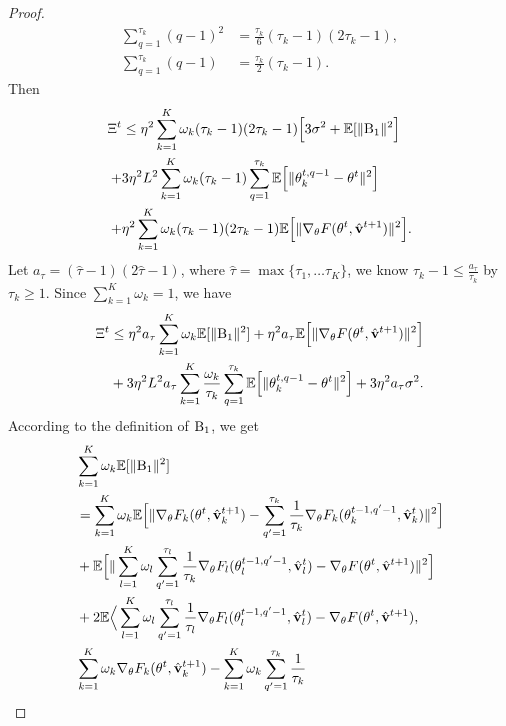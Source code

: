 \documentclass[twoside,journal]{IEEEtran}
\def\VectorFont{\bf}
\newcommand{\vv}{{\VectorFont v}}
\begin{document}
\begin{proof}
\begin{align*}
\sum_{q=1}^{\tau_k}(q-1)^2&=\frac{\tau_k}{6}(\tau_k-1)(2\tau_k-1), \\ \sum_{q=1}^{\tau_k}(q-1)&=\frac{\tau_k}{2}(\tau_k-1).
\end{align*}
Then
\begin{align}\label{eqn: theta1111}
\nonumber\Xi^t &\leq
\eta^2\sum_{k=1}^K\omega_k(\tau_k-1)(2\tau_k-1)\Big[3\sigma^2
+\mathbb{E}[\|\textmd{B}_1\|^2\Big]\\
\nonumber+&
3\eta^2L^2\sum_{k=1}^K\omega_k(\tau_k-1)\sum_{q=1}^{\tau_k}
\mathbb{E}\Big[\|
\theta_k^{t,q-1}-
\theta^{t}\|^2\Big]\\
 +&\eta^2\sum_{k=1}^K\omega_k(\tau_k-1)(2\tau_k-1)\mathbb{E}\Big[\|
\nabla_{\theta}F(\theta^{t},\hat{\vv}^{t+1})
\|^2\Big].
\end{align}
Let  $a_{\tau}=(\hat{\tau}-1)(2\hat{\tau}-1)$, where $\hat{\tau}=\max\{\tau_1,\ldots\tau_K\}$, we know $\tau_k-1\leq \frac{a_{\tau}}{\tau_k}$ by $\tau_k\geq 1$. Since $\sum_{k=1}^K\omega_k=1$,  we have
\begin{align}\label{eqn: theta1112}
\nonumber\Xi^t &\leq
\eta^2a_{\tau}\sum_{k=1}^K\omega_k
\mathbb{E}[\|\textmd{B}_1\|^2]+\eta^2a_{\tau}\mathbb{E}\Big[\|
\nabla_{\theta}F(\theta^{t},\hat{\vv}^{t+1})
\|^2\Big]
\\
&+
3\eta^2L^2a_{\tau}\sum_{k=1}^K\frac{\omega_k}{\tau_k}\sum_{q=1}^{\tau_k}
\mathbb{E}\Big[\|
\theta_k^{t,q-1}-
\theta^{t}\|^2\Big]+3\eta^2a_{\tau}\sigma^2.
\end{align}
According to the definition of $\textmd{B}_1$, we get
\begin{align} \label{eqn: A1}
\nonumber&\sum_{k=1}^K\omega_k\mathbb{E}[\|\textmd{B}_1\|^2] \\
\nonumber&=
\sum_{k=1}^K\omega_k
\mathbb{E}\Big[\|
\nabla_{\theta}F_k(\theta^{t},\hat{\vv}_k^{t+1})
-
\sum_{q^\prime=1}^{\tau_k}\frac{1}{\tau_k}
\nabla_{\theta} F_k(\theta_k^{t-1,q^\prime-1}, \hat \vv_k^{t})\|^2\Big]\\
\nonumber&+\mathbb{E}\Big[\|
\sum_{l=1}^K\omega_l\sum_{q^\prime=1}^{\tau_l}\frac{1}{\tau_k}
\nabla_{\theta} F_l(\theta_l^{t-1,q^\prime-1}, \hat \vv_l^{t})
-\nabla_{\theta}F(\theta^{t},\hat{\vv}^{t+1})\|^2\Big]\\
\nonumber&+2\mathbb{E}\Big\langle\sum_{l=1}^K\omega_l\sum_{q^\prime=1}^{\tau_l}\frac{1}{\tau_l}
\nabla_{\theta} F_l(\theta_l^{t-1,q^\prime-1}, \hat \vv_l^{t})
-\nabla_{\theta}F(\theta^{t},\hat{\vv}^{t+1}),\\
\nonumber&
\sum_{k=1}^K\omega_k\nabla_{\theta}F_k(\theta^{t},\hat{\vv}_k^{t+1})
-
\sum_{k=1}^K\omega_k\sum_{q^\prime=1}^{\tau_k}\frac{1}{\tau_k}

\end{align}
\end{proof}
\end{document}
